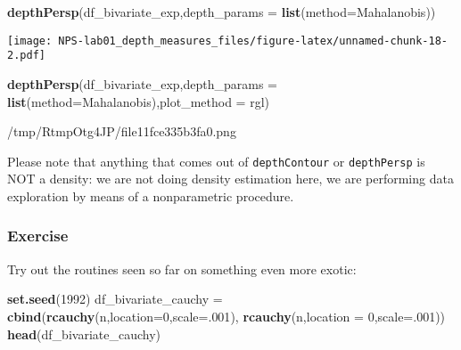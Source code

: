 \documentclass[
]{article}
\newenvironment{Shaded}{\begin{snugshade}}{\end{snugshade}}
\newcommand{\AttributeTok}[1]{\textcolor[rgb]{0.13,0.29,0.53}{#1}}
\newcommand{\DecValTok}[1]{\textcolor[rgb]{0.00,0.00,0.81}{#1}}
\newcommand{\FunctionTok}[1]{\textcolor[rgb]{0.13,0.29,0.53}{\textbf{#1}}}
\newcommand{\NormalTok}[1]{#1}
\newcommand{\OtherTok}[1]{\textcolor[rgb]{0.56,0.35,0.01}{#1}}
\newcommand{\StringTok}[1]{\textcolor[rgb]{0.31,0.60,0.02}{#1}}
\begin{document}
\begin{Shaded}
\begin{Highlighting}[]
\FunctionTok{depthPersp}\NormalTok{(df\_bivariate\_exp,}\AttributeTok{depth\_params =} \FunctionTok{list}\NormalTok{(}\AttributeTok{method=}\StringTok{\textquotesingle{}Mahalanobis\textquotesingle{}}\NormalTok{))}
\end{Highlighting}
\end{Shaded}

\texttt{[image: NPS-lab01\_depth\_measures\_files/figure-latex/unnamed-chunk-18-2.pdf]}

\begin{Shaded}
\begin{Highlighting}[]
\FunctionTok{depthPersp}\NormalTok{(df\_bivariate\_exp,}\AttributeTok{depth\_params =} \FunctionTok{list}\NormalTok{(}\AttributeTok{method=}\StringTok{\textquotesingle{}Mahalanobis\textquotesingle{}}\NormalTok{),}\AttributeTok{plot\_method =} \StringTok{\textquotesingle{}rgl\textquotesingle{}}\NormalTok{)}
\end{Highlighting}
\end{Shaded}

/tmp/RtmpOtg4JP/file11fce335b3fa0.png

Please note that anything that comes out of \texttt{depthContour} or
\texttt{depthPersp} is NOT a density: we are not doing density
estimation here, we are performing data exploration by means of a
nonparametric procedure.

\hypertarget{exercise}{%
\subsubsection{Exercise}\label{exercise}}

Try out the routines seen so far on something even more exotic:

\begin{Shaded}
\begin{Highlighting}[]
\FunctionTok{set.seed}\NormalTok{(}\DecValTok{1992}\NormalTok{)}
\NormalTok{df\_bivariate\_cauchy }\OtherTok{=} \FunctionTok{cbind}\NormalTok{(}\FunctionTok{rcauchy}\NormalTok{(n,}\AttributeTok{location=}\DecValTok{0}\NormalTok{,}\AttributeTok{scale=}\NormalTok{.}\DecValTok{001}\NormalTok{), }\FunctionTok{rcauchy}\NormalTok{(n,}\AttributeTok{location =} \DecValTok{0}\NormalTok{,}\AttributeTok{scale=}\NormalTok{.}\DecValTok{001}\NormalTok{))}
\FunctionTok{head}\NormalTok{(df\_bivariate\_cauchy)}
\end{Highlighting}
\end{Shaded}
\end{document}
